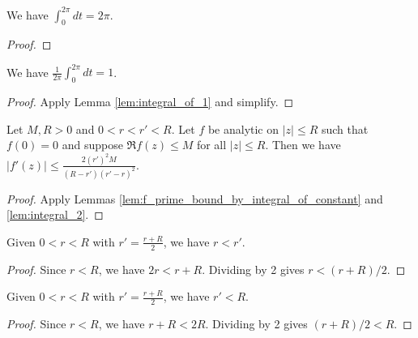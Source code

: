 
\begin{lemma}\label{lem:integral_of_1} \leanok
We have $\int_0^{2\pi} dt = 2\pi$.
\end{lemma}
\begin{proof}\leanok
\end{proof}


\begin{lemma}\label{lem:integral_2} \leanok
We have $\frac{1}{2\pi}\int_0^{2\pi} dt = 1$.
\end{lemma}
\begin{proof}\leanok
{}
Apply Lemma \ref{lem:integral_of_1} and simplify.
\end{proof}


\begin{lemma}\label{lem:f_prime_bound} \leanok
Let $M,R>0$ and $0<r<r'<R$. Let $f$ be analytic on $|z| \le R$ such that $f(0)=0$ and suppose $\Re f(z) \le M$ for all $|z| \le R$. Then we have
$|f'(z)| \le \frac{2(r')^2M}{(R-r')(r'-r)^2}$.
\end{lemma}
\begin{proof}\leanok
{}
Apply Lemmas \ref{lem:f_prime_bound_by_integral_of_constant} and \ref{lem:integral_2}.
\end{proof}



\begin{lemma}\label{lem:r_prime_gt_r} \leanok
Given $0 < r < R$ with $r'=\frac{r+R}{2}$, we have $r < r'$.
\end{lemma}
\begin{proof}\leanok
Since $r<R$, we have $2r < r+R$. Dividing by 2 gives $r < (r+R)/2$.
\end{proof}


\begin{lemma}\label{lem:r_prime_lt_R} \leanok
Given $0 < r < R$ with $r'=\frac{r+R}{2}$, we have $r' < R$.
\end{lemma}
\begin{proof}\leanok
Since $r<R$, we have $r+R < 2R$. Dividing by 2 gives $(r+R)/2 < R$.
\end{proof}

